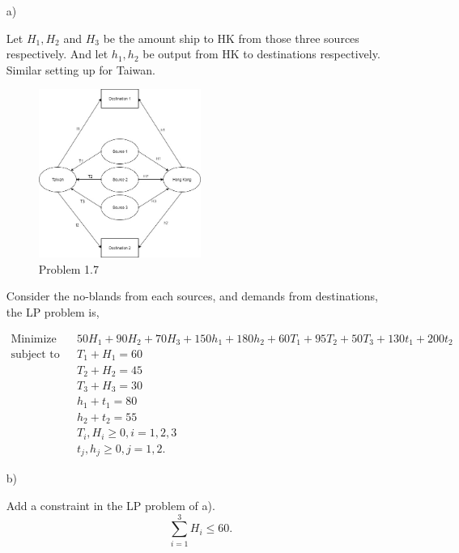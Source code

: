 \documentclass[12pt]{article}
\begin{document}
\begin{enumerate}
\item[a)]

Let $H_1, H_2$ and $H_3$ be the amount ship to HK from those three sources respectively. And let $h_1, h_2$ be output from HK to destinations respectively. Similar setting up for Taiwan.

\FloatBarrier

\begin{figure}[htpb]
  \caption{Problem 1.7}
  \centering
    \includegraphics[width=0.5\textwidth]{fig3.jpg}
\end{figure}

\FloatBarrier

Consider the no-blands from each sources, and demands from destinations, the LP problem is,

\begin{equation*}
\begin{aligned}
\text{Minimize} \quad & 50H_1 + 90 H_2 + 70H_3 + 150h_1 + 180h_2 + 60T_1 + 95T_2 + 50 T_3 + 130t_1 + 200 t_2 \\
\text{subject\  to} \quad & T_1 + H_1 = 60 \\
& T_2 + H_2 = 45 \\
& T_3 + H_3 = 30 \\
& h_1 + t_1 = 80 \\
& h_2 + t_2 = 55 \\
& T_i, H_i \geqslant 0, i = 1, 2, 3 \\
& t_j, h_j \geqslant 0, j = 1, 2.
\end{aligned}
\end{equation*}

\item[b)]

Add a constraint in the LP problem of a).
$$
\sum_{i = 1}^3 H_i \leqslant 60.
$$



\end{enumerate}
\end{document}
